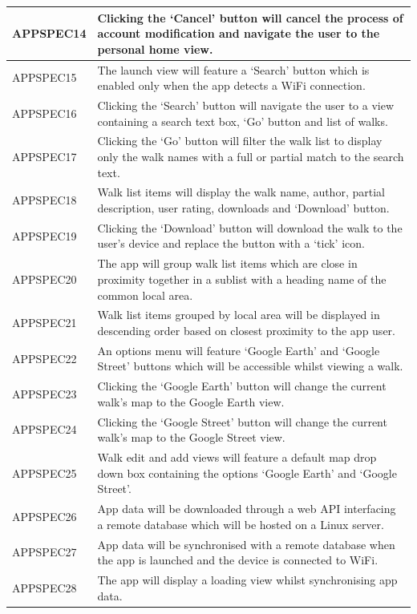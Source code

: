 \documentclass[11pt,a4paper]{article}
\begin{document}
\begin{longtable}{|p{2.5cm}p{13cm}|}
APPSPEC14 & Clicking the `Cancel' button will cancel the process of account modification and navigate the user to the personal home view. \\ \hline
APPSPEC15 & The launch view will feature a `Search' button which is enabled only when the app detects a WiFi connection. \\ \hline
APPSPEC16 & Clicking the `Search' button will navigate the user to a view containing a search text box, `Go' button and list of walks. \\ \hline
APPSPEC17 & Clicking the `Go' button will filter the walk list to display only the walk names with a full or partial match to the search text. \\ \hline
APPSPEC18 & Walk list items will display the walk name, author, partial description, user rating, downloads and `Download' button. \\ \hline
APPSPEC19 & Clicking the `Download' button will download the walk to the user's device and replace the button with a `tick' icon. \\ \hline
APPSPEC20 & The app will group walk list items which are close in proximity together in a sublist with a heading name of the common local area. \\ \hline
APPSPEC21 & Walk list items grouped by local area will be displayed in descending order based on closest proximity to the app user. \\ \hline
APPSPEC22 & An options menu will feature `Google Earth' and `Google Street' buttons which will be accessible whilst viewing a walk. \\ \hline
APPSPEC23 & Clicking the `Google Earth' button will change the current walk's map to the Google Earth view. \\ \hline
APPSPEC24 & Clicking the `Google Street' button will change the current walk's map to the Google Street view. \\ \hline
APPSPEC25 & Walk edit and add views will feature a default map drop down box containing the options `Google Earth' and `Google Street'. \\ \hline
APPSPEC26 & App data will be downloaded through a web API interfacing a remote database which will be hosted on a Linux server.  \\ \hline
APPSPEC27 & App data will be synchronised with a remote database when the app is launched and the device is connected to WiFi. \\ \hline
APPSPEC28 & The app will display a loading view whilst synchronising app data. \\ \hline

\end{longtable}
\end{document}
